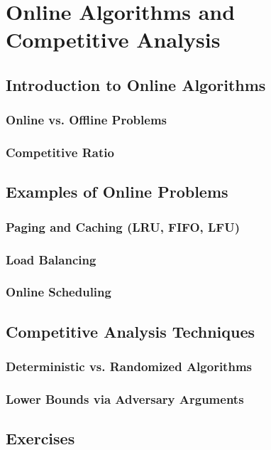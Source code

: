 
\chapter{Online Algorithms and Competitive Analysis}
\section{Introduction to Online Algorithms}
\subsection{Online vs. Offline Problems}
\subsection{Competitive Ratio}

\section{Examples of Online Problems}
\subsection{Paging and Caching (LRU, FIFO, LFU)}
\subsection{Load Balancing}
\subsection{Online Scheduling}

\section{Competitive Analysis Techniques}
\subsection{Deterministic vs. Randomized Algorithms}
\subsection{Lower Bounds via Adversary Arguments}

\section{Exercises}